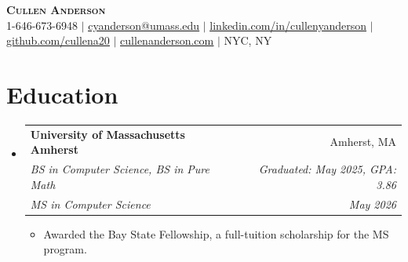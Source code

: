 \documentclass[letterpaper,10.8pt]{article}
\makeatletter
\newcommand{\resumeItem}[1]{
  \item\small{
    {#1 \vspace{-2pt}}
  }
}
\newcommand{\resumeTripleSubheading}[6]{
  \vspace{-2pt}\item
    \begin{tabular*}{0.97\textwidth}[t]{l@{\extracolsep{\fill}}r}
      \textbf{#1} & #2 \\
      \textit{\small#3} & \textit{\small #4} \\
      \textit{\small#5} & \textit{\small #6} \\
    \end{tabular*}\vspace{-7pt}
}
\newcommand{\resumeSubHeadingListStart}{\begin{itemize}[leftmargin=0.15in, label={}]}
\newcommand{\resumeSubHeadingListEnd}{\end{itemize}}
\newcommand{\resumeItemListStart}{\begin{itemize}}
\newcommand{\resumeItemListEnd}{\end{itemize}\vspace{-5pt}}
\makeatother
\begin{document}

\begin{center}
    \textbf{\Huge \scshape Cullen Anderson} \\ \vspace{1pt}
    \small 1-646-673-6948 $|$ \href{mailto:cyanderson@umass.edu}{\underline{cyanderson@umass.edu}} $|$ 
    \href{https://www.linkedin.com/in/cullenyanderson/}{\underline{linkedin.com/in/cullenyanderson}} $|$
    \href{https://github.com/cullena20}{\underline{github.com/cullena20}} $|$
    \href{http://www.cullenanderson.com/}{\underline{cullenanderson.com}} $|$
    \small  NYC, NY
\end{center}


\section{Education}
  \resumeSubHeadingListStart
    \resumeTripleSubheading
      {University of Massachusetts Amherst}{Amherst, MA}
      {BS in Computer Science, BS in Pure Math}{ Graduated: May 2025, GPA: 3.86}
      {MS in Computer Science}{May 2026}
      \resumeItemListStart
        \resumeItem{Awarded the Bay State Fellowship, a full-tuition scholarship for the MS program.}
      \resumeItemListEnd
  \resumeSubHeadingListEnd
\end{document}
